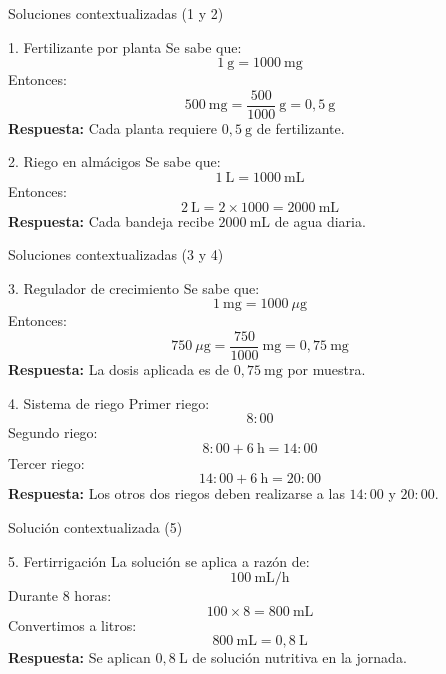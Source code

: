 \documentclass[aspectratio=169,10pt]{beamer}
\begin{document}
	\begin{frame}{Soluciones contextualizadas (1 y 2)}
		\small
		\begin{block}{1. Fertilizante por planta}
			Se sabe que:
			\[
			1\ \text{g} = 1000\ \text{mg}
			\]
			\pause
			Entonces:
			\[
			500\ \text{mg}=\frac{500}{1000}\ \text{g}=0{,}5\ \text{g}
			\]
			\pause
			\textbf{Respuesta:}
			Cada planta requiere \(\boxed{0{,}5\ \text{g}}\) de fertilizante.
		\end{block}
		
		\pause
		\begin{block}{2. Riego en almácigos}
			Se sabe que:
			\[
			1\ \text{L} = 1000\ \text{mL}
			\]
			\pause
			Entonces:
			\[
			2\ \text{L}=2\times 1000=2000\ \text{mL}
			\]
			\pause
			\textbf{Respuesta:}
			Cada bandeja recibe \(\boxed{2000\ \text{mL}}\) de agua diaria.
		\end{block}
	\end{frame}
	
	\begin{frame}{Soluciones contextualizadas (3 y 4)}
		\small
		\begin{block}{3. Regulador de crecimiento}
			Se sabe que:
			\[
			1\ \text{mg} = 1000\ \mu\text{g}
			\]
			\pause
			Entonces:
			\[
			750\ \mu\text{g}=\frac{750}{1000}\ \text{mg}=0{,}75\ \text{mg}
			\]
			\pause
			\textbf{Respuesta:}
			La dosis aplicada es de \(\boxed{0{,}75\ \text{mg}}\) por muestra.
		\end{block}
		
		\pause
		\begin{block}{4. Sistema de riego}
			Primer riego:
			\[
			8{:}00
			\]
			\pause
			Segundo riego:
			\[
			8{:}00 + 6\ \text{h} = 14{:}00
			\]
			\pause
			Tercer riego:
			\[
			14{:}00 + 6\ \text{h} = 20{:}00
			\]
			\pause
			\textbf{Respuesta:}
			Los otros dos riegos deben realizarse a las \(\boxed{14{:}00}\) y \(\boxed{20{:}00}\).
		\end{block}
	\end{frame}
	
	\begin{frame}{Solución contextualizada (5)}
		\small
		\begin{block}{5. Fertirrigación}
			La solución se aplica a razón de:
			\[
			100\ \text{mL/h}
			\]
			Durante \(8\) horas:
			\[
			100 \times 8 = 800\ \text{mL}
			\]
			\pause
			Convertimos a litros:
			\[
			800\ \text{mL} = 0{,}8\ \text{L}
			\]
			\pause
			\textbf{Respuesta:}
			Se aplican \(\boxed{0{,}8\ \text{L}}\) de solución nutritiva en la jornada.
		\end{block}
	\end{frame}
	
\end{document}
